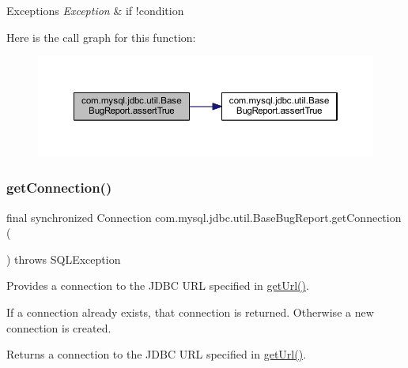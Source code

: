 \begin{DoxyExceptions}{Exceptions}
{\em Exception} & if !condition \\
\hline
\end{DoxyExceptions}
Here is the call graph for this function\+:
\nopagebreak
\begin{figure}[H]
\begin{center}
\leavevmode
\includegraphics[width=350pt]{classcom_1_1mysql_1_1jdbc_1_1util_1_1_base_bug_report_a8b90786036a7a973ea14429854aa3f65_cgraph}
\end{center}
\end{figure}
\mbox{\label{classcom_1_1mysql_1_1jdbc_1_1util_1_1_base_bug_report_a71060585627222c1d40f6cae3b2e9542}} 
\subsubsection{\texorpdfstring{get\+Connection()}{getConnection()}\hspace{0.1cm}{\footnotesize\ttfamily [1/3]}}
{\footnotesize\ttfamily final synchronized Connection com.\+mysql.\+jdbc.\+util.\+Base\+Bug\+Report.\+get\+Connection (\begin{DoxyParamCaption}{ }\end{DoxyParamCaption}) throws S\+Q\+L\+Exception}

Provides a connection to the J\+D\+BC U\+RL specified in \mbox{\hyperlink{classcom_1_1mysql_1_1jdbc_1_1util_1_1_base_bug_report_a99f7e2402d349f45c11a4cd09ba4f62a}{get\+Url()}}.

If a connection already exists, that connection is returned. Otherwise a new connection is created.

\begin{DoxyReturn}{Returns}
a connection to the J\+D\+BC U\+RL specified in \mbox{\hyperlink{classcom_1_1mysql_1_1jdbc_1_1util_1_1_base_bug_report_a99f7e2402d349f45c11a4cd09ba4f62a}{get\+Url()}}.
\end{DoxyReturn}

